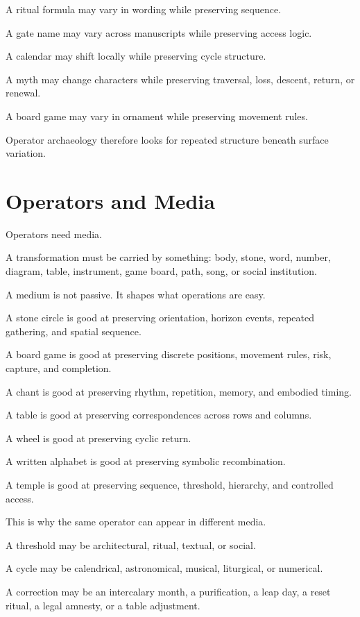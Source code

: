 \documentclass[11pt]{book}
\begin{document}
A ritual formula may vary in wording while preserving sequence.

A gate name may vary across manuscripts while preserving access logic.

A calendar may shift locally while preserving cycle structure.

A myth may change characters while preserving traversal, loss, descent, return, or renewal.

A board game may vary in ornament while preserving movement rules.

Operator archaeology therefore looks for repeated structure beneath surface variation.

\section{Operators and Media}

Operators need media.

A transformation must be carried by something: body, stone, word, number, diagram, table, instrument, game board, path, song, or social institution.

A medium is not passive. It shapes what operations are easy.

A stone circle is good at preserving orientation, horizon events, repeated gathering, and spatial sequence.

A board game is good at preserving discrete positions, movement rules, risk, capture, and completion.

A chant is good at preserving rhythm, repetition, memory, and embodied timing.

A table is good at preserving correspondences across rows and columns.

A wheel is good at preserving cyclic return.

A written alphabet is good at preserving symbolic recombination.

A temple is good at preserving sequence, threshold, hierarchy, and controlled access.

This is why the same operator can appear in different media.

A threshold may be architectural, ritual, textual, or social.

A cycle may be calendrical, astronomical, musical, liturgical, or numerical.

A correction may be an intercalary month, a purification, a leap day, a reset ritual, a legal amnesty, or a table adjustment.
\end{document}
